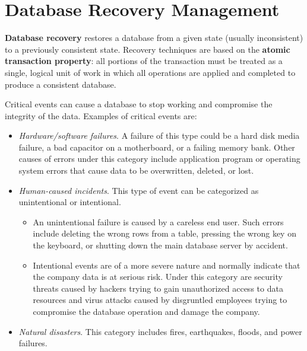 \documentclass[a4paper, 11pt, titlepage]{report}
\begin{document}
\section{Database Recovery Management}
\textbf{Database recovery} restores a database from a given state (usually inconsistent) to a previously consistent state. Recovery techniques are based on the \textbf{atomic transaction property}: all portions of the transaction must be treated as a single, logical unit of work in which all operations are applied and completed to produce a consistent database.

Critical events can cause a database to stop working and compromise the integrity of the data. Examples of critical events are:
\begin{itemize}
\item \textit{Hardware/software failures}. A failure of this type could be a hard disk media failure,
a bad capacitor on a motherboard, or a failing memory bank. Other causes of errors under this category include application program or operating system errors that cause data to be overwritten, deleted, or lost.
\item \textit{Human-caused incidents}. This type of event can be categorized as unintentional or
intentional.
\begin{itemize}
\item An unintentional failure is caused by a careless end user. Such errors include deleting the wrong rows from a table, pressing the wrong key on the keyboard, or shutting down the main database server by accident.
\item Intentional events are of a more severe nature and normally indicate that the company data is at serious risk. Under this category are security threats caused by hackers trying to gain unauthorized access to data resources and virus attacks caused by disgruntled employees trying to compromise the database operation and damage the company.
\end{itemize}
\item \textit{Natural disasters}. This category includes fires, earthquakes, floods, and power failures.
\end{itemize}
\end{document}
